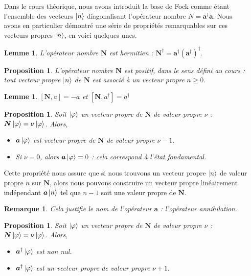 \documentclass[11pt,oneside,a4paper]{article}
\newtheorem{lemma}[theorem]{Lemme}
\newtheorem{property}[theorem]{Proposition}
\newtheorem{remark}[theorem]{Remarque}
\begin{document}
Dans le cours théorique, nous avons introduit la base de Fock comme étant l'ensemble des vecteurs $\ket{n}$ diagonalisant l'opérateur nombre $N=\bm{a}^\dagger \bm{a}$. Nous avons en particulier démontré une série de propriétés remarquables sur ces vecteurs propres $\ket{n}$, en voici quelques unes.

\begin{lemma}
  L'opérateur nombre $\bm{N}$ est hermitien : $\bm{N}^\dagger = \bm{a}^\dagger \left(\bm{a}^\dagger\right)^\dagger$.
\end{lemma}

\begin{property}
  L'opérateur nombre $\bm{N}$ est positif, dans le sens défini au cours : tout vecteur propre $\ket{n}$ de $\bm{N}$ est associé à un vecteur propre $n\geq 0$.
\end{property}
\begin{lemma}
  $[\bm{N},a]=-a$ et $[\bm{N},a^\dagger] = a^\dagger$
\end{lemma}
\begin{property}
  \label{Vp destruction}
  Soit $\ket{\varphi}$ un vecteur propre de $\bm{N}$ de valeur propre $\nu$ : $\bm{N}\ket{\varphi} = \nu\ket{\varphi}$. Alors,
  \begin{itemize}
      \item $\bm{a}\ket{\varphi}$ est vecteur propre de $\bm{N}$ de valeur propre $\nu-1$.
      \item Si $\nu = 0$, alors $\bm{a}\ket{\varphi} = 0$ : cela correspond à l'état fondamental.
  \end{itemize}
\end{property}
Cette propriété nous assure que si nous trouvons un vecteur propre $\ket{n}$ de valeur propre $n$ sur $\bm{N}$, alors nous pouvons construire un vecteur propre linéairement indépendant $\bm{a}\ket{n}$ tel que $n-1$ soit une valeur propre de $\bm{N}$.
\begin{remark}
  Cela justifie le nom de l'opérateur $\bm{a}$ : l'opérateur annihilation.
\end{remark}
\begin{property}
  Soit $\ket{\varphi}$ un vecteur propre de $\bm{N}$ de valeur propre $\nu$ : $\bm{N}\ket{\varphi} = \nu\ket{\varphi}$. Alors,
  \begin{itemize}
      \item $\bm{a}^\dagger\ket{\varphi}$ est non nul.
      \item $\bm{a}^\dagger\ket{\varphi}$ est un vecteur propre de valeur propre $\nu+1$.
  \end{itemize}
\end{property}
\end{document}
